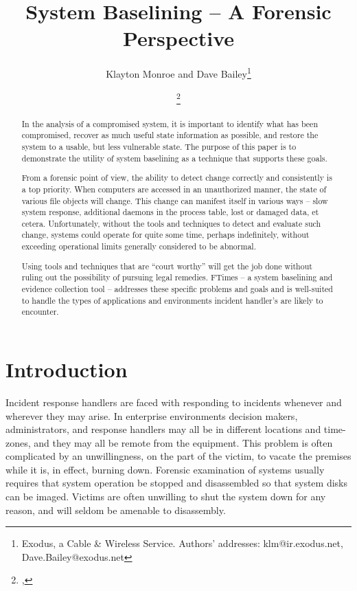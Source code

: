\documentclass[10pt]{article}
\title{\Large\bf System Baselining -- A Forensic Perspective}
\author{Klayton Monroe and Dave Bailey\thanks{Exodus, a Cable \& Wireless Service. Authors' addresses: klm@ir.exodus.net, Dave.Bailey@exodus.net}}
\date{\VersionString\thanks{\CVSRevisionString, \CVSDateString}}
\begin{document}
\maketitle

\begin{abstract}

In the analysis of a compromised system, it is important to identify
what has been compromised, recover as much useful state information
as possible, and restore the system to a usable, but less vulnerable
state.  The purpose of this paper is to demonstrate the utility of
system baselining as a technique that supports these goals.

From a forensic point of view, the ability to detect change correctly
and consistently is a top priority.  When computers are accessed
in an unauthorized manner, the state of various file objects will
change.  This change can manifest itself in various ways -- slow
system response, additional daemons in the process table, lost or
damaged data, et cetera.  Unfortunately, without the tools and
techniques to detect and evaluate such change, systems could operate
for quite some time, perhaps indefinitely, without exceeding
operational limits generally considered to be abnormal.

Using tools and techniques that are ``court worthy'' will get the
job done without ruling out the possibility of pursuing legal
remedies.  FTimes -- a system baselining and evidence collection
tool -- addresses these specific problems and goals and is well-suited
to handle the types of applications and environments incident
handler's are likely to encounter.

\end{abstract}

\section{Introduction}

Incident response handlers are faced with responding to incidents
whenever and wherever they may arise.  In enterprise environments
decision makers, administrators, and response handlers may all be
in different locations and time-zones, and they may all be remote
from the equipment.  This problem is often complicated by an
unwillingness, on the part of the victim, to vacate the premises
while it is, in effect, burning down.  Forensic examination of
systems usually requires that system operation be stopped and
disassembled so that system disks can be imaged.  Victims are often
unwilling to shut the system down for any reason, and will seldom
be amenable to disassembly.
\end{document}
